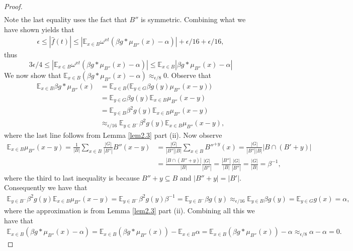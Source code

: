 \documentclass[11pt]{article}
\theoremstyle{definition}
\begin{document}
\begin{proof}
\begin{align*}
\end{align*}
Note the last equality uses the fact that $B''$ is symmetric.  Combining what we have shown yields that 
\begin{align*}
\epsilon \leq |\widehat{f}(t)|\leq |\mathbb{E}_{x\in B}\omega^{xt}(\beta g\ast \mu_{B''}(x)-\alpha)|+\epsilon/16+\epsilon/16,
\end{align*}
thus 
$$
3\epsilon/4\leq |\mathbb{E}_{x\in B}\omega^{xt}(\beta g\ast \mu_{B''}(x)-\alpha)|\leq \mathbb{E}_{x\in B}|\beta g\ast \mu_{B''}(x)-\alpha|
$$
We now show that $\mathbb{E}_{x\in B}(\beta g\ast \mu_{B''}(x)-\alpha)\approx_{\epsilon/8}0$.  Observe that 
\begin{align*}
\mathbb{E}_{x\in B}\beta g\ast \mu_{B''}(x)&=\mathbb{E}_{x\in B}\Big(\mathbb{E}_{y\in G}\beta g(y)\mu_{B''}(x-y)
\Big)\\
&=\mathbb{E}_{y\in G}\beta g(y)\mathbb{E}_{x\in B}\mu_{B''}(x-y)\\
&=\mathbb{E}_{y\in B}\beta^2 g(y)\mathbb{E}_{x\in B}\mu_{B''}(x-y)\\
&\approx_{\epsilon/16}\mathbb{E}_{y\in B^{-}}\beta^2 g(y)\mathbb{E}_{x\in B}\mu_{B''}(x-y),
\end{align*}
where the last line follows from Lemma \ref{lem2.3} part (ii).  Now observe 
\begin{align*}
\mathbb{E}_{x\in B}\mu_{B''}(x-y)=\frac{1}{|B|}\sum_{x\in B}\frac{|G|}{|B''|}B''(x-y)&=\frac{|G|}{|B''||B|}\sum_{x\in B}B''^{+y}(x)=\frac{|G|}{|B''||B|}|B\cap (B'+y)|\\
&=\frac{|B\cap (B''+y)|}{|B|}\frac{|G|}{|B''|}=\frac{|B''|}{|B|}\frac{|G|}{|B''|}=\frac{|G|}{|B|}=\beta^{-1},
\end{align*}
where the third to last inequality is because $B''+y\subseteq B$ and $|B''+y|=|B'|$.  Consequently we have that 
\begin{align*}
\mathbb{E}_{y\in B^{-}}\beta^2 g(y)\mathbb{E}_{x\in B}\mu_{B''}(x-y)=\mathbb{E}_{y\in B^{-}}\beta^2 g(y)\beta^{-1}=\mathbb{E}_{y\in B^{-}}\beta g(y)\approx_{\epsilon/16} \mathbb{E}_{y\in B}\beta g(y)=\mathbb{E}_{y\in G}g(x)=\alpha,
\end{align*}
where the approximation is from Lemma \ref{lem2.3} part (ii).  Combining all this we have that 
\begin{align*}
\mathbb{E}_{x\in B}(\beta g\ast \mu_{B''}(x)-\alpha)=\mathbb{E}_{x\in B}(\beta g\ast \mu_{B''}(x))-\mathbb{E}_{x\in B}\alpha =\mathbb{E}_{x\in B}(\beta g\ast \mu_{B''}(x))-\alpha\approx_{\epsilon/8}\alpha - \alpha =0.
\end{align*}

\end{proof}
\end{document}
